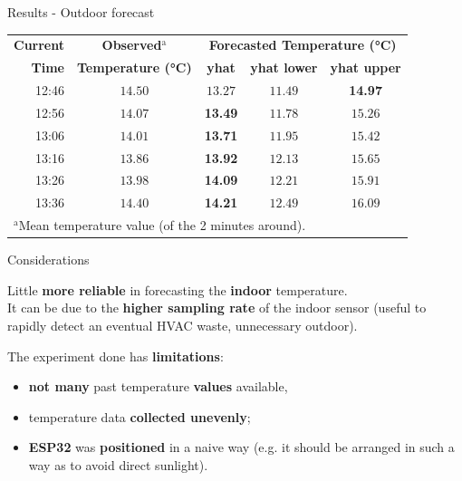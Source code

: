 \documentclass{beamer}
\begin{document}
\begin{frame}{Results - Outdoor forecast}

	\begin{table}[htbp]\small
		\begin{center}
			\begin{tabular}{|r||c||c|c|c|}
				\hline
				\textbf{Current} & \textbf{Observed}$^{\mathrm{a}}$ & \multicolumn{3}{|c|}{\textbf{Forecasted Temperature (°C)}} \\
				\cline{3-5}
				\textbf{Time} & \textbf{Temperature (°C)} & \textbf{yhat} & \textbf{yhat lower} & \textbf{yhat upper} \\
				\hline
				\hline
				12:46 & $14.50$ & $13.27$ & $11.49$ & \textbf{14.97} \\
				\hline
				12:56 & $14.07$ & \textbf{13.49} & $11.78$ & $15.26$ \\
				\hline
				13:06 & $14.01$ & \textbf{13.71} & $11.95$ & $15.42$ \\
				\hline
				13:16 & $13.86$ & \textbf{13.92} & $12.13$ & $15.65$ \\
				\hline
				13:26 & $13.98$ & \textbf{14.09} & $12.21$ & $15.91$ \\
				\hline
				13:36 & $14.40$ & \textbf{14.21} & $12.49$ & $16.09$ \\
				\hline
				\multicolumn{4}{l}{$^{\mathrm{a}}$Mean temperature value (of the 2 minutes around).}
			\end{tabular}
			\label{tab_forecast_outdoor}
		\end{center}
	\end{table}
\end{frame}


\begin{frame}{Considerations}

	Little \textbf{more reliable} in forecasting the \textbf{indoor} temperature.\\
	It can be due to the \textbf{higher sampling rate} of the indoor sensor (useful to rapidly detect an eventual HVAC waste, unnecessary outdoor).
	
	\vfill
	
	The experiment done has \textbf{limitations}:
	\begin{itemize}
		\item \textbf{not many} past temperature \textbf{values} available,
		\item temperature data \textbf{collected unevenly};
		\item \textbf{ESP32} was \textbf{positioned} in a naive way (e.g. it should be arranged in such a way as to avoid direct sunlight).
	\end{itemize}

\end{frame}
\end{document}
